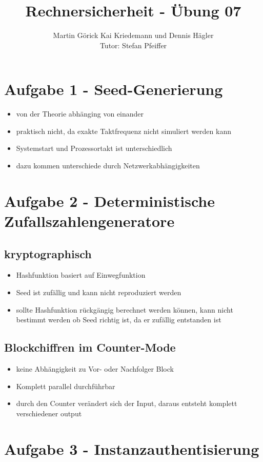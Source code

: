 \documentclass{scrartcl}
\title{Rechnersicherheit - Übung 07}
\author{Martin Görick Kai Kriedemann und Dennis Hägler \\ Tutor: Stefan Pfeiffer}
\begin{document}
\maketitle


\section*{Aufgabe 1 - Seed-Generierung}
\begin{itemize}
  \item von der Theorie abhänging von einander
  \item praktisch nicht, da exakte Taktfrequenz nicht simuliert werden kann
  \item Systemstart und Prozessortakt ist unterschiedlich
  \item dazu kommen unterschiede durch Netzwerkabhängigkeiten
\end{itemize}

\section*{Aufgabe 2 - Deterministische Zufallszahlengeneratore}
\subsection*{kryptographisch}
\begin{itemize}
  \item Hashfunktion basiert auf Einwegfunktion
  \item Seed ist zufällig und kann nicht reproduziert werden
  \item sollte Hashfunktion rückgängig berechnet werden können, kann nicht
    bestimmt werden ob Seed richtig ist, da er zufällig entstanden ist
\end{itemize}

\subsection*{Blockchiffren im Counter-Mode}
\begin{itemize}
  \item keine Abhängigkeit zu Vor- oder Nachfolger Block
  \item Komplett parallel durchführbar
  \item durch den Counter verändert sich der Input, daraus entsteht komplett
    verschiedener output
\end{itemize}

\section*{Aufgabe 3 - Instanzauthentisierung}
\end{document}

